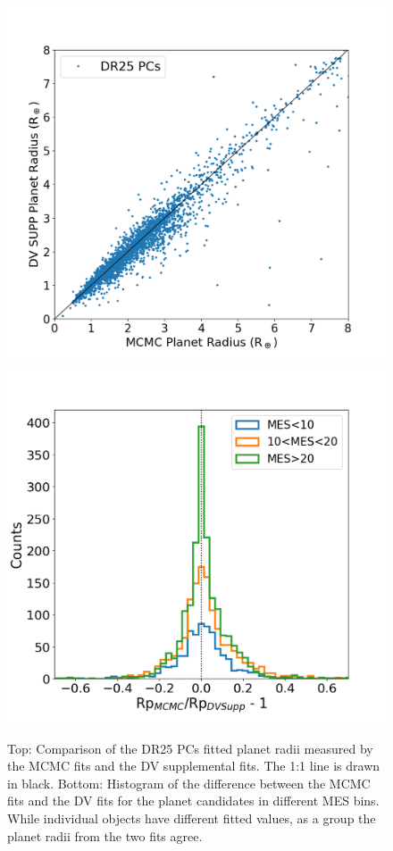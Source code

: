\begin{figure}[htb]
\centering
\includegraphics[width=\linewidth]{fig-comparePradius-mcmcSup.png}
\includegraphics[width=\linewidth]{fig-comparePradius-histogram.png}
\caption{Top: Comparison of the DR25 PCs fitted planet radii measured by the MCMC fits and the DV supplemental fits. The 1:1 line is drawn in black. Bottom: Histogram of the difference between the MCMC fits and the DV fits for the planet candidates in different MES bins. While individual objects have different fitted values, as a group the planet radii from the two fits agree. }
\label{f:mcmcsupp}
\end{figure}


